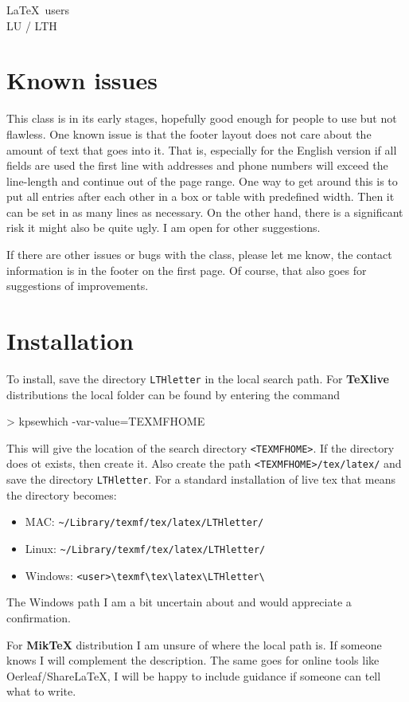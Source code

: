 \documentclass[11pt,eng,LU,logoBW]{LTHletter}
\begin{document}
\begin{letter}{\LaTeX\ users\\ LU / LTH}
  \section{Known issues}
  This class is in its early stages, hopefully good enough for people to use but not flawless. One known issue is that the footer layout does not care about the amount of text that goes into it. That is, especially for the English version if all fields are used the first line with addresses and phone numbers will exceed the line-length and continue out of the page range. One way to get around this is to put all entries after each other in a box or table with predefined width. Then it can be set in as many lines as necessary. On the other hand, there is a significant risk it might also be quite ugly. I am open for other suggestions.

  If there are other issues or bugs with the class, please let me know, the contact information is in the footer on the first page. Of course, that also goes for suggestions of improvements.

  \section{Installation}
  To install, save the directory \texttt{LTHletter} in the local search path. For \textbf{TeXlive} distributions the local folder can be found by entering the command
  \begin{CodeBox}{}
> kpsewhich -var-value=TEXMFHOME
  \end{CodeBox}
  This will give the location of the search directory \verb|<TEXMFHOME>|. If the directory does ot exists, then create it. Also create the path \verb|<TEXMFHOME>/tex/latex/| and save the directory \texttt{LTHletter}. For a standard installation of live tex that means the directory becomes:
  \begin{itemize}
  \item MAC: \verb|~/Library/texmf/tex/latex/LTHletter/|
  \item Linux: \verb|~/Library/texmf/tex/latex/LTHletter/|
  \item Windows: \verb|<user>\texmf\tex\latex\LTHletter\|
  \end{itemize}
  The Windows path I am a bit uncertain about and would appreciate a confirmation.

  For \textbf{MikTeX} distribution I am unsure of where the local path is. If someone knows I will complement the description. The same goes for online tools like Oerleaf/ShareLaTeX, I will be happy to include guidance if someone can tell what to write.


\end{letter}
\end{document}
